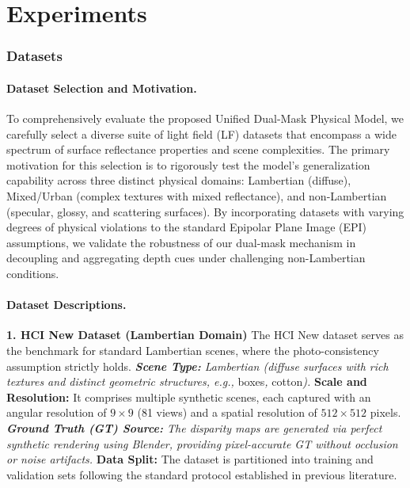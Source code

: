 \section{Experiments}

\subsubsection{Datasets}

\paragraph{Dataset Selection and Motivation.}
To comprehensively evaluate the proposed Unified Dual-Mask Physical Model, we carefully select a diverse suite of light field (LF) datasets that encompass a wide spectrum of surface reflectance properties and scene complexities. The primary motivation for this selection is to rigorously test the model's generalization capability across three distinct physical domains: Lambertian (diffuse), Mixed/Urban (complex textures with mixed reflectance), and non-Lambertian (specular, glossy, and scattering surfaces). By incorporating datasets with varying degrees of physical violations to the standard Epipolar Plane Image (EPI) assumptions, we validate the robustness of our dual-mask mechanism in decoupling and aggregating depth cues under challenging non-Lambertian conditions.

\paragraph{Dataset Descriptions.}

\textbf{1. HCI New Dataset (Lambertian Domain)}
The HCI New dataset  serves as the benchmark for standard Lambertian scenes, where the photo-consistency assumption strictly holds. 
\textit{   \textbf{Scene Type:} Lambertian (diffuse surfaces with rich textures and distinct geometric structures, e.g., }boxes\textit{, }cotton\textit{).
}   \textbf{Scale and Resolution:} It comprises multiple synthetic scenes, each captured with an angular resolution of $9 \times 9$ (81 views) and a spatial resolution of $512 \times 512$ pixels.
\textit{   \textbf{Ground Truth (GT) Source:} The disparity maps are generated via perfect synthetic rendering using Blender, providing pixel-accurate GT without occlusion or noise artifacts.
}   \textbf{Data Split:} The dataset is partitioned into training and validation sets following the standard protocol established in previous literature.

